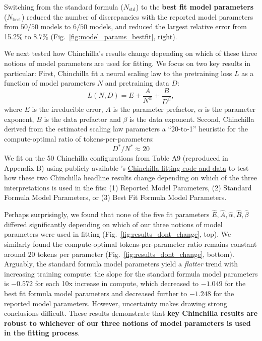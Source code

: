 Switching from the standard formula ($N_{\text{std}}$) to the \textbf{best fit model parameters} ($N_{\text{best}}$) reduced the number of discrepancies with the reported model parameters from $50/50$ models to $6/50$ models, and reduced the largest relative error from 15.2\% to 8.7\% (Fig.~\ref{fig:model_params_bestfit}, right).

We next tested how Chinchilla's results change depending on which of these three notions of model parameters are used for fitting.
We focus on two key results in particular:
First, Chinchilla fit a neural scaling law to the pretraining loss $L$ as a function of model parameters $N$ and pretraining data $D$:
%
\begin{equation}\label{eqn:scaling_law}
    L(N, D) = E + \frac{A}{N^{\alpha}} + \frac{B}{D^{\beta}},
\end{equation}
%
where $E$ is the irreducible error, $A$ is the parameter prefactor, $\alpha$ is the parameter exponent, $B$ is the data prefactor and $\beta$ is the data exponent. Second, Chinchilla derived from the estimated scaling law parameters a ``20-to-1'' heuristic for the compute-optimal ratio of tokens-per-parameters:
%
\begin{equation}
    D^* / N^* \approx 20
\end{equation}
%
We fit on the 50 Chinchilla configurations from Table A9 (reproduced in Appendix B) using publicly available \citet{besiroglu2024chinchillascalingreplicationattempt}'s \href{https://github.com/epoch-research/analyzing-chinchilla/}{Chinchilla fitting code and data} to test how these two Chinchilla headline results change depending on which of the three interpretations is used in the fits: (1)  Reported Model Parameters, (2) Standard Formula Model Parameters, or (3) Best Fit Formula Model Parameters.

Perhaps surprisingly, we found that none of the five fit parameters $\hat{E}, \hat{A}, \hat{\alpha}, \hat{B}, \hat{\beta}$ differed significantly depending on which of our three notions of model parameters were used in fitting (Fig.~\ref{fig:results_dont_change}, top).
We similarly found the compute-optimal tokens-per-parameter ratio remains constant around $20$ tokens per parameter (Fig.~\ref{fig:results_dont_change}, bottom).
Arguably, the standard formula model parameters yield a \textit{flatter} trend with increasing training compute: the slope for the standard formula model parameters is $-0.572$ for each 10x increase in compute, which decreased to $-1.049$ for the best fit formula model parameters and decreased further to $-1.248$ for the reported model parameters.
However, uncertainty makes drawing strong conclusions difficult.
These results demonstrate that \textbf{key Chinchilla results are robust to whichever of our three notions of model parameters is used in the fitting process}.